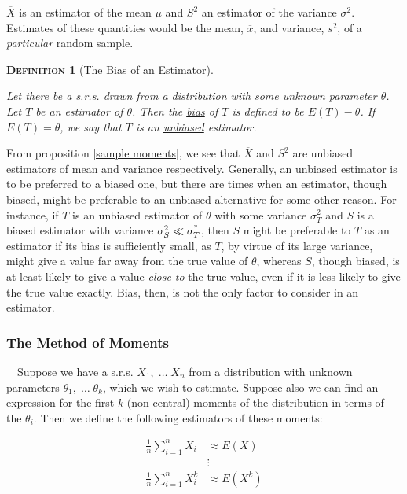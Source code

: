 \documentclass[12pt,a4paper]{article}
\newtheorem{definition}{\textsc{Definition}}[section]
\begin{document}
$\overline{X}$ is an estimator of the mean $\mu$ and $S^2$ an estimator of the variance $\sigma^2$. Estimates of these quantities would be the mean, $\overline{x}$, and variance, $s^2$, of a \emph{particular} random sample.

\begin{definition}[The Bias of an Estimator]$\;$\par\vspace{1cm}

Let there be a s.r.s. drawn from a distribution with some unknown parameter $\theta$. Let $T$ be an estimator of $\theta$. Then the \underline{bias} of $T$ is defined to be $E(T) - \theta$. If $E(T) = \theta$, we say that $T$ is an \underline{unbiased} estimator.

\end{definition}

From proposition \ref{sample moments}, we see that $\overline{X}$ and $S^2$ are unbiased estimators of mean and variance respectively. Generally, an unbiased estimator is to be preferred to a biased one, but there are times when an estimator, though biased, might be preferable to an unbiased alternative for some other reason. For instance, if $T$ is an unbiased estimator of $\theta$ with some variance $\sigma_T^2$ and $S$ is a biased estimator with variance $\sigma_S^2\ll \sigma^"_T$, then $S$ might be preferable to $T$ as an estimator if its bias is sufficiently small, as $T$, by virtue of its large variance, might give a value far away from the true value of $\theta$, whereas $S$, though biased, is at least likely to give a value \emph{close to} the true value, even if it is less likely to give the true value exactly. Bias, then, is not the only factor to consider in an estimator.

\subsubsection{The Method of Moments}

$\quad$Suppose we have a s.r.s. $X_1,\;\hdots\; X_n$ from a distribution with unknown parameters $\theta_1,\;\hdots\; \theta_k$, which we wish to estimate. Suppose also we can find an expression for the first $k$ (non-central) moments of the distribution in terms of the $\theta_i$. Then we define the following estimators of these moments:

\begin{align*}
\frac{1}{n}\sum_{i=1}^n X_i &\approx E(X)\\
&\vdots\\
\frac{1}{n}\sum_{i=1}^n X_i^k &\approx E(X^k)
\end{align*}
\end{document}
